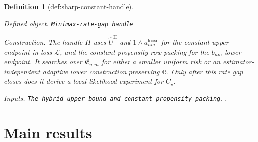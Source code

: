 \documentclass{article}
\newtheorem{definition}{Definition}
\begin{document}
\begin{definition}[def:sharp-constant-handle]\label{def:sharp-constant-handle}
\par\smallskip\noindent\emph{Defined object.} \texttt{Minimax-\allowbreak{}rate-\allowbreak{}gap handle}
\par\smallskip\noindent\emph{Construction.} The handle \(H\) uses \(\widehat U^{\mathrm H}\) and \(1\wedge a^{\mathrm{loose}}_{nm}\) for the constant upper endpoint in loss \(\mathcal L\), and the constant-propensity row packing for the \(b_{nm}\) lower endpoint.  It searches over \(\mathfrak E_{n,m}\) for either a smaller uniform risk or an estimator-independent adaptive lower construction preserving \(\mathbb G\).  Only after this rate gap closes does it derive a local likelihood experiment for \(C_\star\).
\par\smallskip\noindent\emph{Inputs.} \texttt{The hybrid upper bound and constant-\allowbreak{}propensity packing.}.
\end{definition}

\section{Main results}
\end{document}
